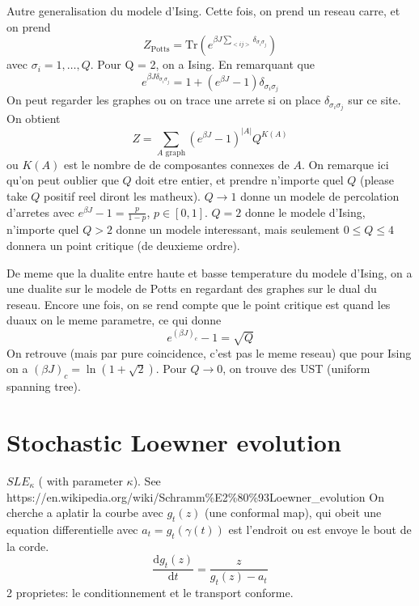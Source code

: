 \documentclass[a4paper]{book}
\theoremstyle{definition}
\theoremstyle{remark}
\begin{document}
Autre generalisation du modele d'Ising. \newline 
Cette fois, on prend un reseau carre, et on prend 
\begin{equation}
    Z_{\text{Potts}} = \text{Tr}(e^{\beta J \sum_{<ij>}\delta_{\sigma_i \sigma_j}})
\end{equation}
avec $\sigma_i = 1,\dots , Q$. Pour Q = 2, on a Ising. En remarquant que 
\begin{equation}
    e^{\beta J \delta _{\sigma_i \sigma_j}} = 1 + (e^{\beta J} - 1)\delta _{\sigma_i \sigma_j}
\end{equation}
On peut regarder les graphes ou on trace une arrete si on place $\delta _{\sigma_i \sigma_j}$ sur ce site. On obtient 
\begin{equation}
    Z = \sum_{A \text{ graph}} (e^{\beta J} - 1)^{|A|} Q^{K(A)}
\end{equation}
ou $K(A)$ est le nombre de de composantes connexes de $A$. 
On remarque ici qu'on peut oublier que $Q$ doit etre entier, et prendre n'importe quel $Q$ (please take $Q$ positif reel diront les matheux). $Q \rightarrow 1$ donne un modele de percolation d'arretes avec $e^{\beta J} - 1 = \frac{p}{1-p}$, $p\in [0,1]$. $Q = 2$ donne le modele d'Ising, n'importe quel $Q > 2$ donne un modele interessant, mais seulement $0\leq Q \leq 4$ donnera un point critique (de deuxieme ordre).\par \medskip
De meme que la dualite entre haute et basse temperature du modele d'Ising, on a une dualite sur le modele de Potts en regardant des graphes sur le dual du reseau. Encore une fois, on se rend compte que le point critique est quand les duaux on le meme parametre, ce qui donne 
\begin{equation}
    e^{(\beta J)_c} - 1 = \sqrt{Q}
\end{equation}
On retrouve (mais par pure coincidence, c'est pas le meme reseau) que pour Ising on a $(\beta J)_c = \ln (1 + \sqrt{2})$. Pour $Q \rightarrow 0$, on trouve des UST (uniform spanning tree). 

\chapter{Stochastic Loewner evolution}

$SLE_\kappa$ ( with parameter $\kappa$).\newline  
See https://en.wikipedia.org/wiki/Schramm\%E2\%80\%93Loewner\_evolution \newline
On cherche a aplatir la courbe avec $g_t(z)$ (une conformal map), qui obeit une equation differentielle avec $a_t = g_t(\gamma(t))$ est l'endroit ou est envoye le bout de la corde. 
\begin{equation} 
    \frac{\text{d}g_t(z)}{\text{d}t} = \frac{z}{g_t(z) - a_t}
\end{equation}
2 proprietes: le conditionnement et le transport conforme. 
\end{document}
